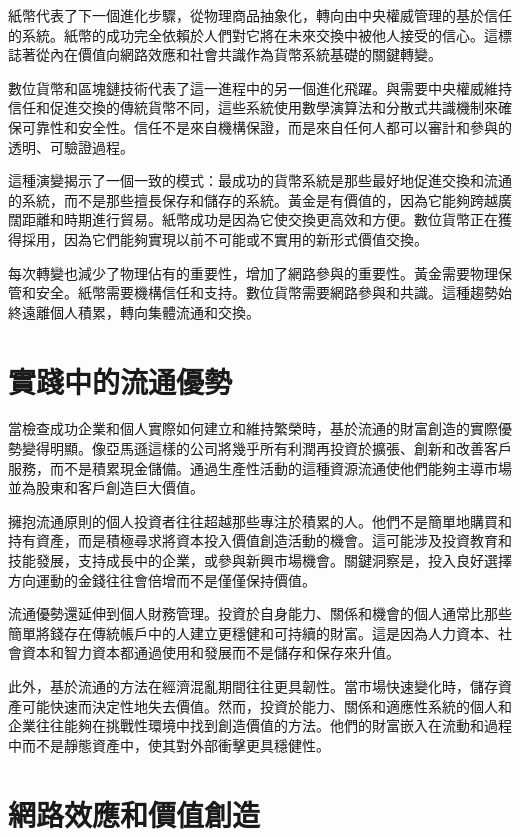 \documentclass[
  Letterpaper,
]{scrbook}
\begin{document}
紙幣代表了下一個進化步驟，從物理商品抽象化，轉向由中央權威管理的基於信任的系統。紙幣的成功完全依賴於人們對它將在未來交換中被他人接受的信心。這標誌著從內在價值向網路效應和社會共識作為貨幣系統基礎的關鍵轉變。

數位貨幣和區塊鏈技術代表了這一進程中的另一個進化飛躍。與需要中央權威維持信任和促進交換的傳統貨幣不同，這些系統使用數學演算法和分散式共識機制來確保可靠性和安全性。信任不是來自機構保證，而是來自任何人都可以審計和參與的透明、可驗證過程。

這種演變揭示了一個一致的模式：最成功的貨幣系統是那些最好地促進交換和流通的系統，而不是那些擅長保存和儲存的系統。黃金是有價值的，因為它能夠跨越廣闊距離和時期進行貿易。紙幣成功是因為它使交換更高效和方便。數位貨幣正在獲得採用，因為它們能夠實現以前不可能或不實用的新形式價值交換。

每次轉變也減少了物理佔有的重要性，增加了網路參與的重要性。黃金需要物理保管和安全。紙幣需要機構信任和支持。數位貨幣需要網路參與和共識。這種趨勢始終遠離個人積累，轉向集體流通和交換。

\section{實踐中的流通優勢}\label{ux5be6ux8e10ux4e2dux7684ux6d41ux901aux512aux52e2}

當檢查成功企業和個人實際如何建立和維持繁榮時，基於流通的財富創造的實際優勢變得明顯。像亞馬遜這樣的公司將幾乎所有利潤再投資於擴張、創新和改善客戶服務，而不是積累現金儲備。通過生產性活動的這種資源流通使他們能夠主導市場並為股東和客戶創造巨大價值。

擁抱流通原則的個人投資者往往超越那些專注於積累的人。他們不是簡單地購買和持有資產，而是積極尋求將資本投入價值創造活動的機會。這可能涉及投資教育和技能發展，支持成長中的企業，或參與新興市場機會。關鍵洞察是，投入良好選擇方向運動的金錢往往會倍增而不是僅僅保持價值。

流通優勢還延伸到個人財務管理。投資於自身能力、關係和機會的個人通常比那些簡單將錢存在傳統帳戶中的人建立更穩健和可持續的財富。這是因為人力資本、社會資本和智力資本都通過使用和發展而不是儲存和保存來升值。

此外，基於流通的方法在經濟混亂期間往往更具韌性。當市場快速變化時，儲存資產可能快速而決定性地失去價值。然而，投資於能力、關係和適應性系統的個人和企業往往能夠在挑戰性環境中找到創造價值的方法。他們的財富嵌入在流動和過程中而不是靜態資產中，使其對外部衝擊更具穩健性。

\section{網路效應和價值創造}\label{ux7db2ux8defux6548ux61c9ux548cux50f9ux503cux5275ux9020}
\end{document}
